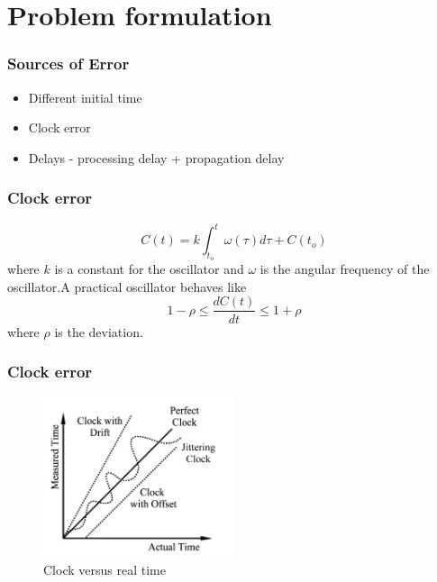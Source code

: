 \documentclass[t]{beamer}
\begin{document}
\section{Problem formulation}
\begin{frame}
\frametitle{Sources of Error}
\begin{itemize}
\item Different initial time \newline \newline
\item Clock error \newline \newline
\item Delays - processing delay + propagation delay \newline
\end{itemize}
\end{frame}
\begin{frame}
\frametitle{Clock error}
\begin{equation}
C(t) = k\int_{t_o}^{t} {\omega(\tau)d\tau} + C(t_o)
\end{equation}
where $k$ is a constant for the oscillator and $\omega$ is the
angular frequency of the oscillator.\newline A practical oscillator
behaves like
\begin{equation}
1-\rho \leq \frac{dC(t)}{dt} \leq 1+\rho
\end{equation}
where $\rho$ is the deviation.
\end{frame}
\begin{frame}
\frametitle{Clock error}
\begin{figure}
\centering
\includegraphics[width = 0.5\textwidth]{actualvsmeasuredtime}
\caption{Clock versus real time}
\end{figure}
\end{frame}
\end{document}
